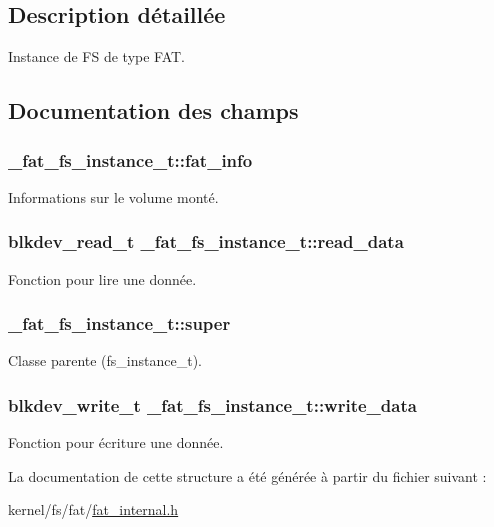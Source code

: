 \subsection{Description détaillée}
Instance de F\-S de type F\-A\-T. 

\subsection{Documentation des champs}
\hypertarget{struct__fat__fs__instance__t_acebada58b620f950c9ef3c454db812fc}{
\subsubsection[{fat\-\_\-info}]{ \-\_\-fat\-\_\-fs\-\_\-instance\-\_\-t\-::fat\-\_\-info}}\label{struct__fat__fs__instance__t_acebada58b620f950c9ef3c454db812fc}
Informations sur le volume monté. \hypertarget{struct__fat__fs__instance__t_adfdb319d2d87dc55a678366740a2bba9}{
\subsubsection[{read\-\_\-data}]{\setlength{\rightskip}{0pt plus 5cm}blkdev\-\_\-read\-\_\-t \-\_\-fat\-\_\-fs\-\_\-instance\-\_\-t\-::read\-\_\-data}}\label{struct__fat__fs__instance__t_adfdb319d2d87dc55a678366740a2bba9}
Fonction pour lire une donnée. \hypertarget{struct__fat__fs__instance__t_ac50318180f107a1950961c404ec6fd6d}{
\subsubsection[{super}]{ \-\_\-fat\-\_\-fs\-\_\-instance\-\_\-t\-::super}}\label{struct__fat__fs__instance__t_ac50318180f107a1950961c404ec6fd6d}
Classe parente (fs\-\_\-instance\-\_\-t). \hypertarget{struct__fat__fs__instance__t_a3056aeef9254049e772d6475510b0957}{
\subsubsection[{write\-\_\-data}]{\setlength{\rightskip}{0pt plus 5cm}blkdev\-\_\-write\-\_\-t \-\_\-fat\-\_\-fs\-\_\-instance\-\_\-t\-::write\-\_\-data}}\label{struct__fat__fs__instance__t_a3056aeef9254049e772d6475510b0957}
Fonction pour écriture une donnée. 

La documentation de cette structure a été générée à partir du fichier suivant \-:\begin{DoxyCompactItemize}
\item 
kernel/fs/fat/\hyperlink{fat__internal_8h}{fat\-\_\-internal.\-h}\end{DoxyCompactItemize}
